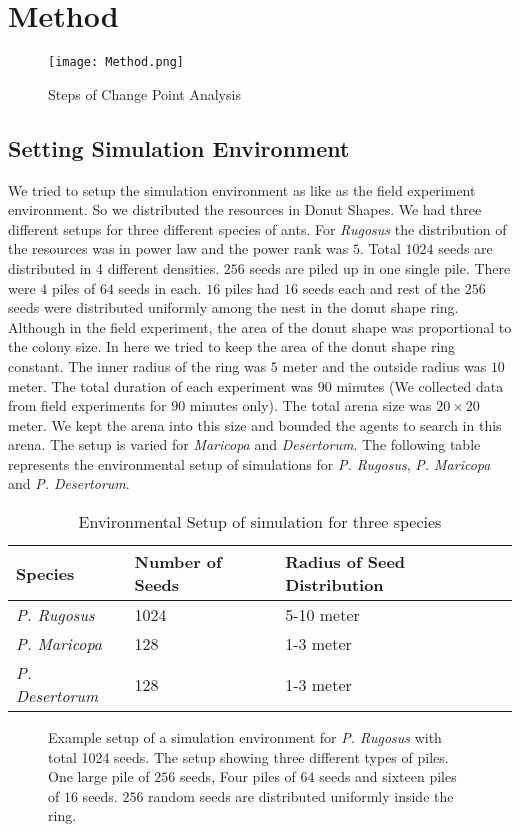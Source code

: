 \chapter{Method}
\begin{figure}[h]
	\texttt{[image: Method.png]}
	\caption{Steps of Change Point Analysis}
\end{figure}
\section{\label{section:Setting Simulation Environment}Setting Simulation Environment}
We tried to setup the simulation environment as like as the field experiment environment. So we distributed the resources in Donut Shapes. We had three different setups for three different species of ants. For \textit{Rugosus} the distribution of the resources was in power law and the power rank was $5$. Total $1024$ seeds are distributed in 4 different densities. $256$ seeds are piled up in one single pile. There were $4$ piles of $64$ seeds in each. $16$ piles had $16$ seeds each and rest of the $256$ seeds were distributed uniformly among the nest in the donut shape ring. Although in the field experiment, the area of the donut shape was proportional to the colony size. In here we tried to keep the area of the donut shape ring constant. The inner radius of the ring was $5$ meter and the outside radius was $10$ meter. The total duration of each experiment was $90$ minutes (We collected data from field experiments for $90$ minutes only). The total arena size was $20\times20$ meter. We kept the arena into this size and bounded the agents to search in this arena.  The setup is varied for \textit{Maricopa} and \textit{Desertorum}. The following table represents the environmental setup of simulations for \textit{P. Rugosus}, \textit{P. Maricopa} and \textit{P. Desertorum}.
\begin{table}
	\begin{tabular}{ |p{}|p{}|p{}| } 
		\hline
		\textbf{Species} & \textbf{Number of Seeds} & \textbf{Radius of Seed Distribution} \\
		\hline 
		\textit{P. Rugosus} & 1024 & 5-10 meter\\ 
		\hline
		\textit{P. Maricopa} & 128 & 1-3 meter\\ 
		\hline
		 \textit{P. Desertorum} & 128 & 1-3 meter\\
		\hline
	\end{tabular}
	\caption{Environmental Setup of simulation for three species}
\end{table}
\begin{figure}[!h]
	\caption{Example setup of a simulation environment for \textit{P. Rugosus} with total 1024 seeds. The setup showing three different types of piles. One large pile of $256$ seeds, Four piles of $64$ seeds and sixteen piles of $16$ seeds. $256$ random seeds are distributed uniformly inside the ring. }
\end{figure}
